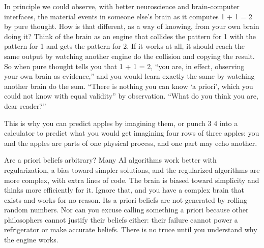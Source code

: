 In principle we could observe, with better neuroscience and brain-computer interfaces, the material events in someone else's brain as it computes 1 + 1 = 2 by pure thought. How is that different, as a way of knowing, from your own brain doing it? Think of the brain as an engine that collides the pattern for 1 with the pattern for 1 and gets the pattern for 2. If it works at all, it should reach the same output by watching another engine do the collision and copying the result. So when pure thought tells you that 1 + 1 = 2, ``you are, in effect, observing your own brain as evidence,'' and you would learn exactly the same by watching another brain do the sum. ``There is nothing you can know `a priori', which you could not know with equal validity'' by observation. ``What do you think you are, dear reader?''

This is why you can predict apples by imagining them, or punch 3 \texttimes{} 4 into a calculator to predict what you would get imagining four rows of three apples: you and the apples are parts of one physical process, and one part may echo another. 

Are a priori beliefs arbitrary? Many AI algorithms work better with regularization, a bias toward simpler solutions, and the regularized algorithms are more complex, with extra lines of code. The brain is biased toward simplicity and thinks more efficiently for it. Ignore that, and you have a complex brain that exists and works for no reason. Its a priori beliefs are not generated by rolling random numbers. Nor can you excuse calling something a priori because other philosophers cannot justify their beliefs either: their failure cannot power a refrigerator or make accurate beliefs. There is no truce until you understand why the engine works.

